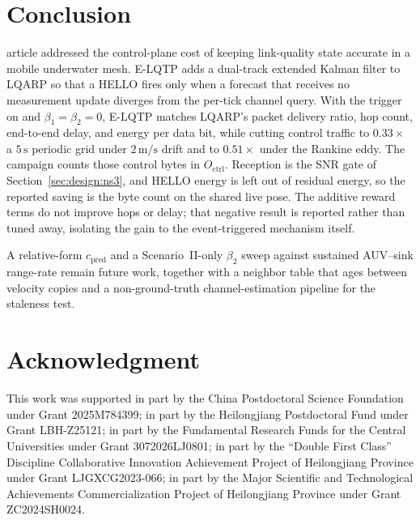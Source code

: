 \section{Conclusion}
\label{sec:conclusion}
 article addressed the control-plane cost of
keeping link-quality state accurate in a mobile underwater mesh.
E-LQTP adds a dual-track extended Kalman filter to LQARP so that a
HELLO fires only when a forecast that receives no measurement update
diverges from the per-tick channel query. With the trigger on and
$\beta_1=\beta_2=0$, E-LQTP matches LQARP's packet
delivery ratio, hop count, end-to-end delay, and energy per data
bit, while cutting control traffic to $0.33\times$ a
$5\,\mathrm{s}$ periodic grid under $2\,\mathrm{m/s}$ drift and
to $0.51\times$ under the Rankine eddy.
The campaign counts those control bytes in $O_{\mathrm{ctrl}}$.
Reception is the SNR gate of Section~\ref{sec:design:ns3}, and
HELLO energy is left out of residual energy, so the reported
saving is the byte count on the shared live pose.
The additive reward terms do not improve hops or delay; that
negative result is reported rather than tuned away, isolating the
gain to the event-triggered mechanism itself.

A relative-form $c_{\mathrm{pred}}$ and a Scenario~II-only
$\beta_2$ sweep against sustained AUV--sink range-rate remain
future work, together with a neighbor table that ages between
velocity copies and a non-ground-truth channel-estimation
pipeline for the staleness test.

\section*{Acknowledgment}
This work was supported in part by the China Postdoctoral Science
Foundation under Grant 2025M784399; in part by the Heilongjiang
Postdoctoral Fund under Grant LBH-Z25121; in part by the Fundamental
Research Funds for the Central Universities under Grant 3072026LJ0801;
in part by the ``Double First Class'' Discipline Collaborative
Innovation Achievement Project of Heilongjiang Province under Grant
LJGXCG2023-066; in part by the Major Scientific and Technological
Achievements Commercialization Project of Heilongjiang Province under
Grant ZC2024SH0024.

